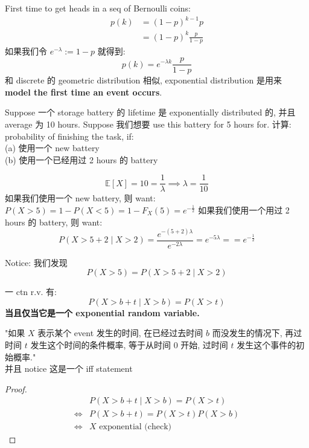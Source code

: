 First time to get heads in a seq of Bernoulli coins:
\begin{align}
    p(k) &= (1-p)^{k-1} p  \\
    &= (1-p)^k \frac{p}{1-p}
\end{align}
如果我们令 $e^{-\lambda} := 1-p$
就得到: \[
p(k) = e^{-\lambda k} \frac{p}{1-p} 
\]
和 discrete 的 geometric distribution 相似, exponential distribution 是用来 \textbf{model the first time an event occurs}.


\begin{example}
    Suppose 一个 storage battery 的 lifetime 是 exponentially distributed 的, 并且 average 为 10 hours. Suppose 我们想要 use this battery for 5 hours for.
计算: probability of finishing the task, if:\\ 
(a) 使用一个 new battery\\
(b) 使用一个已经用过 2 hours 的 battery\\
\begin{solution}
    \[
    \mathbb{E}[X] = 10 = \frac{1}{\lambda} \implies \lambda = \frac{1}{10}
    \]
如果我们使用一个 new battery, 则 want: $P(X>5) = 1 - P(X<5) = 1- F_X(5) = e^{-\frac{1}{2}}$
如果我们使用一个用过 2 hours 的 battery, 则 want: \[
P(X> 5+2 \mid X > 2) = \frac{e^{-(5+2)\lambda}}{e^{-2\lambda }} = e^{-5\lambda} = = e^{-\frac{1}{2}}
\]
\end{solution}

Notice: 我们发现 \[
P(X>5) = P(X> 5+2 \mid X > 2)
\]
\end{example}

\begin{theorem}
一 ctn r.v. 有: \[
    P(X > b+ t \mid X > b) = P(X>t)
    \]
\textbf{当且仅当它是一个 exponential random variable.}
\end{theorem}
\begin{remark}
    "如果 $X$ 表示某个 event 发生的时间, 在已经过去时间 $b$ 而没发生的情况下, 再过时间 $t$ 发生这个时间的条件概率, 等于从时间 $0$ 开始, 过时间 $t$ 发生这个事件的初始概率."\\
    并且 notice 这是一个 iff statement
\end{remark}

\begin{proof}
\begin{align}
     &   P(X > b+ t \mid X > b) = P(X>t) \\
   \Longleftrightarrow  & P(X > b+t) = P(X > t) P(X>b) \\
    \Longleftrightarrow  & X \text{ exponential (check) }
\end{align}
\end{proof}





